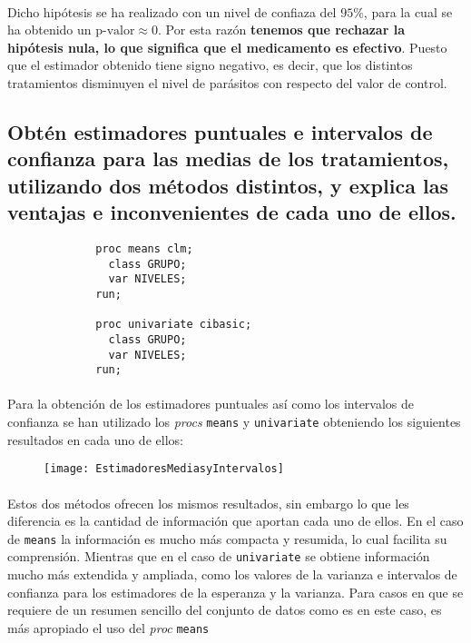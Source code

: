 \documentclass{article}
\begin{document}
      \paragraph{}
      Dicho hipótesis se ha realizado con un nivel de confiaza del $95\%$, para la cual se ha obtenido un $\text{p-valor}\approx 0$. Por esta razón \textbf{tenemos que rechazar la hipótesis nula, lo que significa que el medicamento es efectivo}. Puesto que el estimador obtenido tiene signo negativo, es decir, que los distintos tratamientos disminuyen el nivel de parásitos con respecto del valor de control.

    \subsection{Obtén estimadores puntuales e intervalos de confianza para las medias de los tratamientos, utilizando dos métodos distintos, y explica las ventajas e inconvenientes de cada uno de ellos.}

    \begin{figure}[h]
      \centering
      \begin{verbatim}
        proc means clm;
          class GRUPO;
          var NIVELES;
        run;

        proc univariate cibasic;
          class GRUPO;
          var NIVELES;
        run;
      \end{verbatim}
      \caption{}
      \label{code:sas_4}
    \end{figure}

      \paragraph{}
      Para la obtención de los estimadores puntuales así como los intervalos de confianza se han utilizado los \emph{procs} \texttt{means} y \texttt{univariate} obteniendo los siguientes resultados en cada uno de ellos:


      \begin{figure}[H]
        \centering
        \texttt{[image: EstimadoresMediasyIntervalos]}
      \end{figure}

      \paragraph{}
      Estos dos métodos ofrecen los mismos resultados, sin embargo lo que les diferencia es la cantidad de información que aportan cada uno de ellos. En el caso de \texttt{means} la información es mucho más compacta y resumida, lo cual facilita su comprensión. Mientras que en el caso de \texttt{univariate} se obtiene información mucho más extendida y ampliada, como los valores de la varianza e intervalos de confianza para los estimadores de la esperanza y la varianza. Para casos en que se requiere de un resumen sencillo del conjunto de datos como es en este caso, es más apropiado el uso del \emph{proc} \texttt{means}
\end{document}
